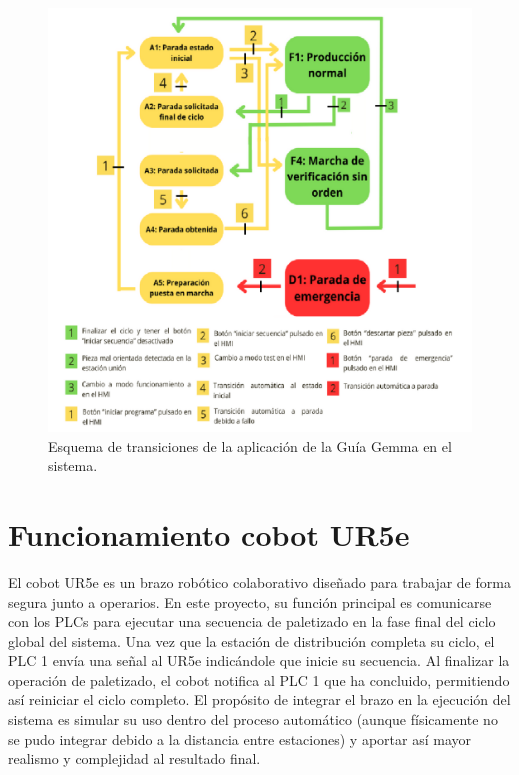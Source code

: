 \begin{figure}[h!]
  \begin{center}
  	\includegraphics[width=16.5cm]{figs/guia_gemma_final}
  \end{center}
  \caption{\centering Esquema de transiciones de la aplicación de la Guía Gemma en el sistema.}
  \label{fig:guia_gemma_final}
\end{figure}

\clearpage

\section{Funcionamiento cobot UR5e}
\label{sec:funcionamiento_ur5e}

El cobot UR5e es un brazo robótico colaborativo diseñado para trabajar de forma segura junto a operarios. En este proyecto, su función principal es comunicarse con los PLCs para ejecutar una secuencia de paletizado en la fase final del ciclo global del sistema. Una vez que la estación de distribución completa su ciclo, el PLC 1 envía una señal al UR5e indicándole que inicie su secuencia. Al finalizar la operación de paletizado, el cobot notifica al PLC 1 que ha concluido, permitiendo así reiniciar el ciclo completo. El propósito de integrar el brazo en la ejecución del sistema es simular su uso dentro del proceso automático (aunque físicamente no se pudo integrar debido a la distancia entre estaciones) y aportar así mayor realismo y complejidad al resultado final. 

